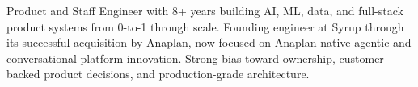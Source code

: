 

\begin{cvparagraph}
Product and Staff Engineer with 8+ years building AI, ML, data, and full-stack product systems from 0-to-1 through scale. Founding engineer at Syrup through its successful acquisition by Anaplan, now focused on Anaplan-native agentic and conversational platform innovation. Strong bias toward ownership, customer-backed product decisions, and production-grade architecture.
\end{cvparagraph}
